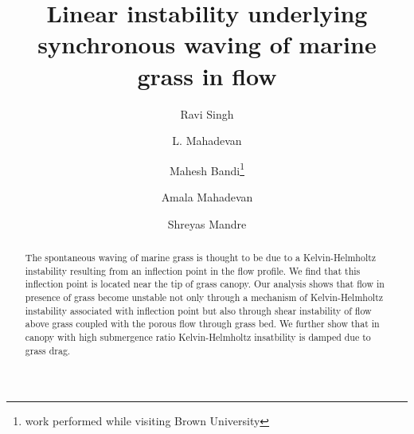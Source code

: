 \documentclass[aps,prl,twocolumn,showpacs,superscriptaddress,groupedaddress,10pt]{revtex4-1}  %
\begin{document}
\title{Linear instability underlying synchronous waving of marine grass in flow}
\author{Ravi Singh}
\author{L. Mahadevan}
\author{Mahesh Bandi\footnote{work performed while visiting Brown University}}
\author{Amala Mahadevan}
\author{Shreyas Mandre}

\begin{abstract}


The spontaneous waving of marine grass is thought to be due to a Kelvin-Helmholtz instability resulting from an inflection point in the flow profile. We find that this inflection point
is located near the tip of grass canopy. Our analysis shows that flow in presence of grass become unstable not only through a mechanism of Kelvin-Helmholtz instability associated with 
inflection point but also through shear instability of flow above grass coupled with the porous flow through grass bed. We further show that in canopy with high submergence ratio
Kelvin-Helmholtz insatbility is damped due to grass drag. 

\end{abstract}
\maketitle
\end{document}
